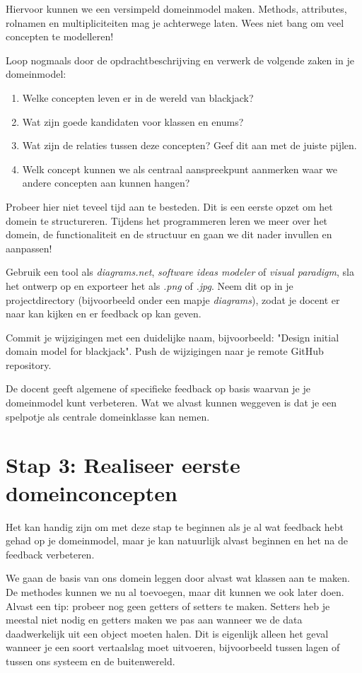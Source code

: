 Hiervoor kunnen we een versimpeld domeinmodel maken. 
Methods, attributes, rolnamen en multipliciteiten mag je achterwege laten.
Wees niet bang om veel concepten te modelleren!

Loop nogmaals door de opdrachtbeschrijving en verwerk de volgende zaken in je 
domeinmodel:
\begin{enumerate}
    \item Welke concepten leven er in de wereld van blackjack? 
    \item Wat zijn goede kandidaten voor klassen en enums?
    \item Wat zijn de relaties tussen deze concepten? Geef dit aan met de juiste pijlen.
    \item Welk concept kunnen we als centraal aanspreekpunt aanmerken waar we andere concepten aan kunnen hangen?
\end{enumerate}

Probeer hier niet teveel tijd aan te besteden.
Dit is een eerste opzet om het domein te structureren.
Tijdens het programmeren leren we meer over het domein, de functionaliteit en de structuur
en gaan we dit nader invullen en aanpassen!

Gebruik een tool als \textit{diagrams.net}, \textit{software ideas modeler} of \textit{visual paradigm},
sla het ontwerp op en exporteer het als \textit{.png} of \textit{.jpg}. 
Neem dit op in je projectdirectory (bijvoorbeeld onder een mapje \textit{diagrams}),
zodat je docent er naar kan kijken en er feedback op kan geven.

Commit je wijzigingen met een duidelijke naam, 
bijvoorbeeld: "Design initial domain model for blackjack". 
Push de wijzigingen naar je remote GitHub repository.

De docent geeft algemene of specifieke feedback
op basis waarvan je je domeinmodel kunt verbeteren.
Wat we alvast kunnen weggeven is dat je een spelpotje 
als centrale domeinklasse kan nemen.

\newpage
\section{Stap 3: Realiseer eerste domeinconcepten}
Het kan handig zijn om met deze stap te beginnen als je al wat feedback hebt 
gehad op je domeinmodel, maar je kan natuurlijk alvast beginnen en het na 
de feedback verbeteren.

We gaan de basis van ons domein leggen door alvast wat klassen aan te maken.
De methodes kunnen we nu al toevoegen, maar dit kunnen we ook later doen. 
Alvast een tip: probeer nog geen getters of setters te maken. 
Setters heb je meestal niet nodig en getters maken we pas aan wanneer
we de data daadwerkelijk uit een object moeten halen. Dit is eigenlijk alleen 
het geval wanneer je een soort vertaalslag moet uitvoeren, bijvoorbeeld tussen 
lagen of tussen ons systeem en de buitenwereld.

